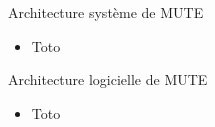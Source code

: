 \begin{frame}{Architecture système de MUTE}
    \vspace{-0.5cm}
    \begin{figure}
    \end{figure}
    \begin{itemize}
        \item Toto
    \end{itemize}
\end{frame}


\begin{frame}{Architecture logicielle de MUTE}
    \vspace{-0.5cm}
    \begin{figure}
    \end{figure}
    \begin{itemize}
        \item Toto
    \end{itemize}
\end{frame}
